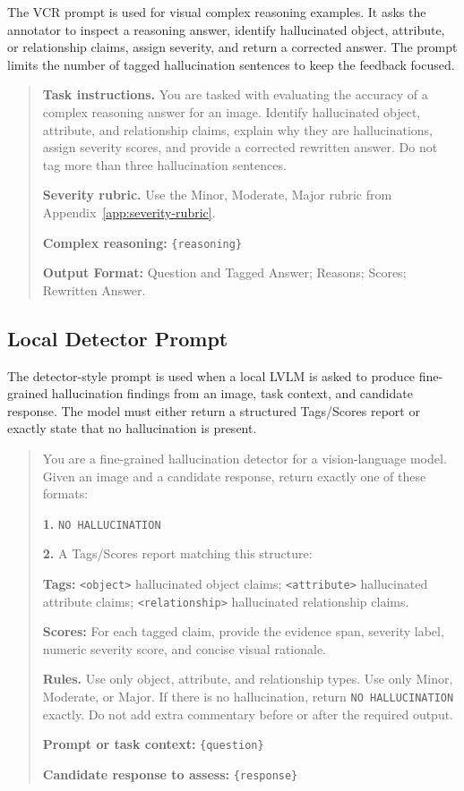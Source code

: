 \documentclass{article}
\begin{document}
The VCR prompt is used for visual complex reasoning examples. It asks the annotator to inspect a reasoning answer, identify hallucinated object, attribute, or relationship claims, assign severity, and return a corrected answer. The prompt limits the number of tagged hallucination sentences to keep the feedback focused.

\begin{quote}
\small
\textbf{Task instructions.}
You are tasked with evaluating the accuracy of a complex reasoning answer for an image. Identify hallucinated object, attribute, and relationship claims, explain why they are hallucinations, assign severity scores, and provide a corrected rewritten answer. Do not tag more than three hallucination sentences.

\textbf{Severity rubric.}
Use the Minor, Moderate, Major rubric from Appendix~\ref{app:severity-rubric}.

\textbf{Complex reasoning:}
\texttt{\{reasoning\}}

\textbf{Output Format:}
Question and Tagged Answer;
Reasons;
Scores;
Rewritten Answer.
\end{quote}

\subsection{Local Detector Prompt}
\label{app:detector-prompt}

The detector-style prompt is used when a local LVLM is asked to produce fine-grained hallucination findings from an image, task context, and candidate response. The model must either return a structured Tags/Scores report or exactly state that no hallucination is present.

\begin{quote}
\small
You are a fine-grained hallucination detector for a vision-language model. Given an image and a candidate response, return exactly one of these formats:

\textbf{1.} \texttt{NO HALLUCINATION}

\textbf{2.} A Tags/Scores report matching this structure:

\textbf{Tags:}
\texttt{<object>} hallucinated object claims;
\texttt{<attribute>} hallucinated attribute claims;
\texttt{<relationship>} hallucinated relationship claims.

\textbf{Scores:}
For each tagged claim, provide the evidence span, severity label, numeric severity score, and concise visual rationale.

\textbf{Rules.}
Use only object, attribute, and relationship types. Use only Minor, Moderate, or Major. If there is no hallucination, return \texttt{NO HALLUCINATION} exactly. Do not add extra commentary before or after the required output.

\textbf{Prompt or task context:}
\texttt{\{question\}}

\textbf{Candidate response to assess:}
\texttt{\{response\}}
\end{quote}
\end{document}
